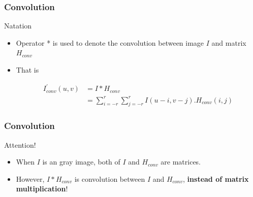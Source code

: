 \documentclass[english,11pt,table,handout]{beamer}
\begin{document}
\frame
{
	\frametitle{Convolution}
	
	\begin{block}{Natation}
		\begin{itemize}
			\item \alert{Operator *} is used to denote the convolution between image $I$ and matrix $H_{conv}$
			\item That is
			
			\begin{equation*} 
			\begin{split}
			I_{conv}^{'}{(u,v)} &= I * H_{conv} \\
				&= \sum_{i=-r}^{r}{\sum_{j=-r}^{r}{I(u-i, v-j).H_{conv}{(i,j)}}}
			\end{split}
			\end{equation*}
		\end{itemize}
		
		
	\end{block}
}
\frame
{
	\frametitle{Convolution}
	
	\begin{alertblock}{Attention!}
		\begin{itemize}
			\item When $I$ is an gray image, both of $I$ and $H_{conv}$ are matrices.
			\item However,  $I * H_{conv}$ is convolution between $I$ and $H_{conv}$, \textbf{instead of matrix multiplication}!
	
	\end{itemize}
	
	
	\end{alertblock}
}
\end{document}
